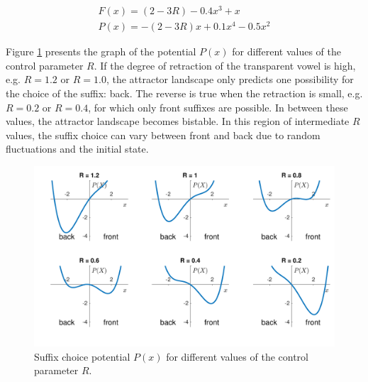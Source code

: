 \begin{equation}
\begin{split}
F(x) = (2-3R) - 0.4 x^3 + x\\
P(x) = -(2-3R)x + 0.1 x^4 - 0.5 x^2
\end{split}
\label{eq:gafos_benus_vowel_harmony_force_potential}
\end{equation}

Figure \ref{fig:gafos_benus_suffix_potential} presents the graph of the potential $P(x)$ for different values of the control parameter $R$. If the degree of retraction of the transparent vowel is high, e.g. $R = 1.2$ or $R = 1.0$, the attractor landscape only predicts one possibility for the choice of the suffix: back. The reverse is true when the retraction is small, e.g. $R = 0.2$ or $R = 0.4$, for which only front suffixes are possible. In between these values, the attractor landscape becomes bistable. In this region of intermediate $R$ values, the suffix choice can vary between front and back due to random fluctuations and the initial state.

\begin{figure}[t]
\includegraphics[width=\textwidth]{figures/ch3/gafos_benus_suffix_potential.pdf}
\caption{Suffix choice potential $P(x)$ for different values of the control parameter $R$.}
\label{fig:gafos_benus_suffix_potential}
\end{figure}

